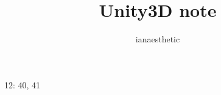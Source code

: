 \documentclass[10pt, a4paper]{article}
\author{ianaesthetic}
\title{Unity3D note}
\begin{document}
12: 40, 41   
\end{document}
